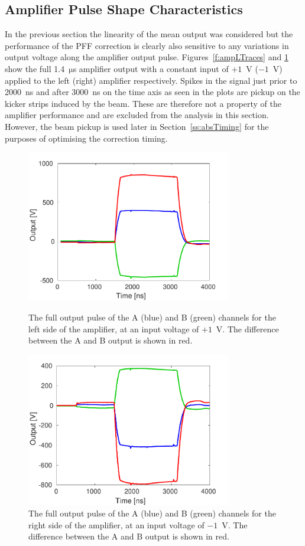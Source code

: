 \subsection{Amplifier Pulse Shape Characteristics}
\label{ss:ampShape}

In the previous section the linearity of the mean output was considered but the performance of the PFF correction is clearly also sensitive to any variations in output voltage along the amplifier output pulse. Figures~\ref{f:ampLTraces} and \ref{f:ampRTraces} show the full 1.4~\(\mathrm{\mu}\)s amplifier output with a constant input of \(+1\)~V (\(-1\)~V) applied to the left (right) amplifier respectively. Spikes in the signal just prior to 2000~ns and after 3000~ns on the time axis as seen in the plots are pickup on the kicker strips induced by the beam. These are therefore not a property of the amplifier performance and are excluded from the analysis in this section. However, the beam pickup is used later in Section~\ref{ss:absTiming} for the purposes of optimising the correction timing.

\begin{figure}
  \centering
  \includegraphics[width=0.8\textwidth]{Figures/commissioning/AmpL_Traces}
  \caption{The full output pulse of the A (blue) and B (green) channels for the left side of the amplifier, at an input voltage of \(+1\)~V. The difference between the A and B output is shown in red.}
  \label{f:ampLTraces}
  \includegraphics[width=0.8\textwidth]{Figures/commissioning/AmpR_Traces}
  \caption{The full output pulse of the A (blue) and B (green) channels for the right side of the amplifier, at an input voltage of \(-1\)~V. The difference between the A and B output is shown in red.}
  \label{f:ampRTraces}
\end{figure}

